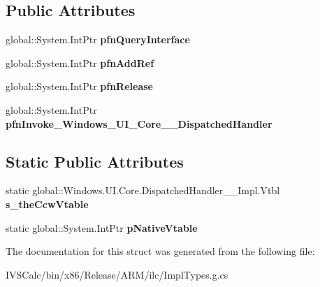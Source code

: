 \subsection*{Public Attributes}
\begin{DoxyCompactItemize}
\item 
\mbox{\label{struct_windows_1_1_u_i_1_1_core_1_1_dispatched_handler_____impl_1_1_vtbl_aa206d7f0abe0a127bcc866f4a92f567d}} 
global\+::\+System.\+Int\+Ptr {\bfseries pfn\+Query\+Interface}
\item 
\mbox{\label{struct_windows_1_1_u_i_1_1_core_1_1_dispatched_handler_____impl_1_1_vtbl_ad1e462aa44a00137f12c457a2270c10a}} 
global\+::\+System.\+Int\+Ptr {\bfseries pfn\+Add\+Ref}
\item 
\mbox{\label{struct_windows_1_1_u_i_1_1_core_1_1_dispatched_handler_____impl_1_1_vtbl_a6f53e54584803a56a8bee059e2d51c1a}} 
global\+::\+System.\+Int\+Ptr {\bfseries pfn\+Release}
\item 
\mbox{\label{struct_windows_1_1_u_i_1_1_core_1_1_dispatched_handler_____impl_1_1_vtbl_acca2172f9302b639504a4f7f501597da}} 
global\+::\+System.\+Int\+Ptr {\bfseries pfn\+Invoke\+\_\+\+Windows\+\_\+\+U\+I\+\_\+\+Core\+\_\+\+\_\+\+Dispatched\+Handler}
\end{DoxyCompactItemize}
\subsection*{Static Public Attributes}
\begin{DoxyCompactItemize}
\item 
\mbox{\label{struct_windows_1_1_u_i_1_1_core_1_1_dispatched_handler_____impl_1_1_vtbl_af2fe2a2113349444eb8315473e778162}} 
static global\+::\+Windows.\+U\+I.\+Core.\+Dispatched\+Handler\+\_\+\+\_\+\+Impl.\+Vtbl {\bfseries s\+\_\+the\+Ccw\+Vtable}
\item 
\mbox{\label{struct_windows_1_1_u_i_1_1_core_1_1_dispatched_handler_____impl_1_1_vtbl_aa4e5482ab05e209d36c71ec41e5205ad}} 
static global\+::\+System.\+Int\+Ptr {\bfseries p\+Native\+Vtable}
\end{DoxyCompactItemize}


The documentation for this struct was generated from the following file\+:\begin{DoxyCompactItemize}
\item 
I\+V\+S\+Calc/bin/x86/\+Release/\+A\+R\+M/ilc/Impl\+Types.\+g.\+cs\end{DoxyCompactItemize}

